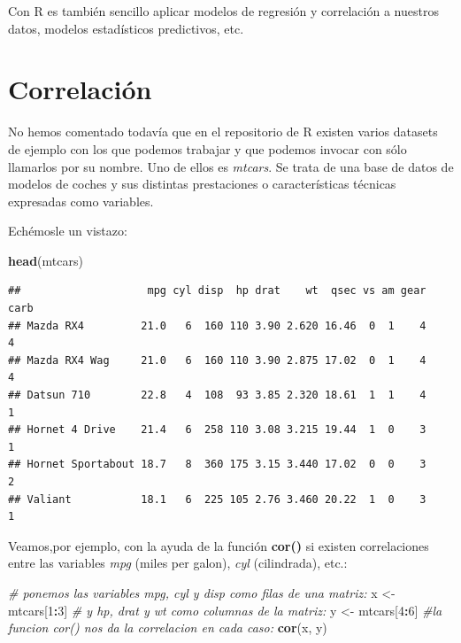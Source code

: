 \documentclass[]{book}
\newenvironment{Shaded}{\begin{snugshade}}{\end{snugshade}}
\newcommand{\CommentTok}[1]{\textcolor[rgb]{0.56,0.35,0.01}{\textit{#1}}}
\newcommand{\DecValTok}[1]{\textcolor[rgb]{0.00,0.00,0.81}{#1}}
\newcommand{\KeywordTok}[1]{\textcolor[rgb]{0.13,0.29,0.53}{\textbf{#1}}}
\newcommand{\NormalTok}[1]{#1}
\newcommand{\OperatorTok}[1]{\textcolor[rgb]{0.81,0.36,0.00}{\textbf{#1}}}
\newcommand{\StringTok}[1]{\textcolor[rgb]{0.31,0.60,0.02}{#1}}
\theoremstyle{definition}
\theoremstyle{definition}
\theoremstyle{definition}
\theoremstyle{remark}
\begin{document}
Con R es también sencillo aplicar modelos de regresión y correlación a
nuestros datos, modelos estadísticos predictivos, etc.

\hypertarget{correlacion}{%
\section{Correlación}\label{correlacion}}

No hemos comentado todavía que en el repositorio de R existen varios
datasets de ejemplo con los que podemos trabajar y que podemos invocar
con sólo llamarlos por su nombre. Uno de ellos es \emph{mtcars}. Se
trata de una base de datos de modelos de coches y sus distintas
prestaciones o características técnicas expresadas como variables.

Echémosle un vistazo:

\begin{Shaded}
\begin{Highlighting}[]
\KeywordTok{head}\NormalTok{(mtcars)}
\end{Highlighting}
\end{Shaded}

\begin{verbatim}
##                    mpg cyl disp  hp drat    wt  qsec vs am gear carb
## Mazda RX4         21.0   6  160 110 3.90 2.620 16.46  0  1    4    4
## Mazda RX4 Wag     21.0   6  160 110 3.90 2.875 17.02  0  1    4    4
## Datsun 710        22.8   4  108  93 3.85 2.320 18.61  1  1    4    1
## Hornet 4 Drive    21.4   6  258 110 3.08 3.215 19.44  1  0    3    1
## Hornet Sportabout 18.7   8  360 175 3.15 3.440 17.02  0  0    3    2
## Valiant           18.1   6  225 105 2.76 3.460 20.22  1  0    3    1
\end{verbatim}

Veamos,por ejemplo, con la ayuda de la función \textbf{cor()} si existen
correlaciones entre las variables \emph{mpg} (miles per galon),
\emph{cyl} (cilindrada), etc.:

\begin{Shaded}
\begin{Highlighting}[]
\CommentTok{# ponemos las variables mpg, cyl y disp como filas de una matriz:}
\NormalTok{x <-}\StringTok{ }\NormalTok{mtcars[}\DecValTok{1}\OperatorTok{:}\DecValTok{3}\NormalTok{] }
\CommentTok{# y hp, drat y wt como columnas de la matriz:}
\NormalTok{y <-}\StringTok{ }\NormalTok{mtcars[}\DecValTok{4}\OperatorTok{:}\DecValTok{6}\NormalTok{]}
\CommentTok{#la funcion cor() nos da la correlacion en cada caso:}
\KeywordTok{cor}\NormalTok{(x, y)}
\end{Highlighting}
\end{Shaded}
\end{document}
